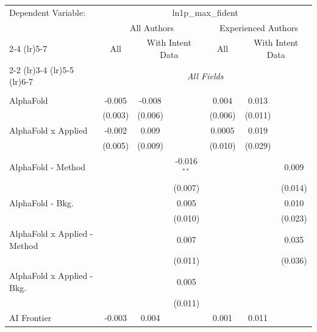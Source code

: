 \begingroup
\centering
\begin{tabular}{lcccccc}
   \tabularnewline \midrule \midrule
   Dependent Variable: & \multicolumn{6}{c}{ln1p\_max\_fident}\\
 & \multicolumn{3}{c}{All Authors} & \multicolumn{3}{c}{Experienced Authors} \\
\cmidrule(lr){2-4} \cmidrule(lr){5-7}
 & \multicolumn{1}{c}{All} & \multicolumn{2}{c}{With Intent Data} & \multicolumn{1}{c}{All} & \multicolumn{2}{c}{With Intent Data} \\
\cmidrule(lr){2-2} \cmidrule(lr){3-4} \cmidrule(lr){5-5} \cmidrule(lr){6-7}
 & \multicolumn{6}{c}{\textit{All Fields}} \\ \\
   AlphaFold                      & -0.005      & -0.008  &               & 0.004   & 0.013   &   \\   
                                  & (0.003)     & (0.006) &               & (0.006) & (0.011) &   \\   
   AlphaFold x Applied            & -0.002      & 0.009   &               & 0.0005  & 0.019   &   \\   
                                  & (0.005)     & (0.009) &               & (0.010) & (0.029) &   \\   
   AlphaFold - Method             &             &         & -0.016$^{**}$ &         &         & 0.009\\   
                                  &             &         & (0.007)       &         &         & (0.014)\\   
   AlphaFold - Bkg.               &             &         & 0.005         &         &         & 0.010\\   
                                  &             &         & (0.010)       &         &         & (0.023)\\   
   AlphaFold x Applied - Method   &             &         & 0.007         &         &         & 0.035\\   
                                  &             &         & (0.011)       &         &         & (0.036)\\   
   AlphaFold x Applied - Bkg.     &             &         & 0.005         &         &         &   \\   
                                  &             &         & (0.011)       &         &         &   \\   
   AI Frontier                    & -0.003      & 0.004   &               & 0.001   & 0.011   &   \\   

\end{tabular}
